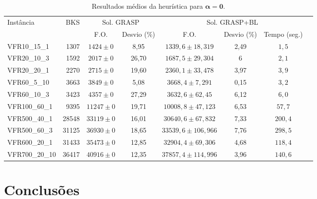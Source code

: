 \documentclass[12pt]{article}
\begin{document}
\begin{table}[ht]
   \centering
   \scriptsize
   \begin{tabular}{lrcccccc}
   \toprule
   \multirow{2}[2]{*}{Instância} & \multirow{2}[2]{*}{BKS} & \multicolumn{2}{c}{Sol. GRASP} & 
      \multicolumn{3}{c}{Sol. GRASP+BL}\\ \cmidrule(r){3-4} \cmidrule{5-7}
   & & F.O. & Desvio (\%) & F.O. & Desvio (\%) & Tempo (seg.)\\
   \midrule
   VFR10\_15\_1 & 1307 & $1424 \pm 0$ & 8,95 & $1339,6 \pm 18,319$ & 2,49 & $1,5$ \\ 
   VFR20\_10\_3 & 1592 & $2017 \pm 0$ & 26,70 & $1687,5 \pm 29,304$ & 6 & $2,1$ \\ 
   VFR20\_20\_1 & 2270 & $2715 \pm 0$ & 19,60 & $2360,1 \pm 33,478$ & 3,97 & $3,9$ \\ 
   VFR60\_5\_10 & 3663 & $3849 \pm 0$ & 5,08 & $3668,4 \pm 7,291$ & 0,15 & $3,2$ \\ 
   VFR60\_10\_3 & 3423 & $4357 \pm 0$ & 27,29 & $3632,6 \pm 62,45$ & 6,12 &
   $6,0$ \\ 
   VFR100\_60\_1 & 9395  & $11247 \pm 0$ & 19,71 & $10008,8 \pm 47,123$ & 6,53 & $57,7$ \\ 
   VFR500\_40\_1 & 28548 & $33119 \pm 0$ & 16,01 & $30640,6 \pm 67,832$ & 7,33 & $200,4$ \\ 
   VFR500\_60\_3 & 31125 & $36930 \pm 0$ & 18,65 & $33539,6 \pm 106,966$ & 7,76 & $298,5$ \\ 
   VFR600\_20\_1 & 31433 & $35473 \pm 0$ & 12,85 & $32904,4 \pm 69,306$ & 4,68 & $118,4$ \\ 
   VFR700\_20\_10 & 36417 & $40916 \pm 0$ & 12,35 & $37857,4 \pm 114,996$ & 3,96 & $140,6$ \\ 
   \bottomrule
   \end{tabular}
   \caption{Resultados médios da heurística para $\bm{\alpha = 0}$.} 
   \label{table:results-heur-short}
\end{table}

\section{Conclusões}
\end{document}
